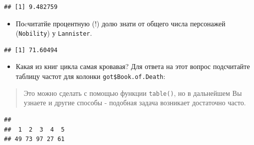 \documentclass[]{book}
\newenvironment{Shaded}{\begin{snugshade}}{\end{snugshade}}
\newcommand{\DecValTok}[1]{\textcolor[rgb]{0.00,0.00,0.81}{#1}}
\newcommand{\KeywordTok}[1]{\textcolor[rgb]{0.13,0.29,0.53}{\textbf{#1}}}
\newcommand{\NormalTok}[1]{#1}
\newcommand{\OperatorTok}[1]{\textcolor[rgb]{0.81,0.36,0.00}{\textbf{#1}}}
\newcommand{\StringTok}[1]{\textcolor[rgb]{0.31,0.60,0.02}{#1}}
\providecommand{\tightlist}{%
  \setlength{\itemsep}{0pt}\setlength{\parskip}{0pt}}
\begin{document}
\begin{verbatim}
## [1] 9.482759
\end{verbatim}

\begin{itemize}
\tightlist
\item
  Поcчитатйе процентную (!) долю знати от общего числа персонажей (\texttt{Nobility}) у \texttt{Lannister}.
\end{itemize}

\begin{Shaded}
\end{Shaded}

\begin{verbatim}
## [1] 71.60494
\end{verbatim}

\begin{itemize}
\tightlist
\item
  Какая из книг цикла самая кровавая? Для ответа на этот вопрос подсчитайте таблицу частот для колонки \texttt{got\$Book.of.Death}:
\end{itemize}

\begin{quote}
Это можно сделать с помощью функции \texttt{table()}, но в дальнейшем Вы узнаете и другие способы - подобная задача возникает достаточно часто.
\end{quote}

\begin{Shaded}
\end{Shaded}

\begin{verbatim}
## 
##  1  2  3  4  5 
## 49 73 97 27 61
\end{verbatim}


\end{document}
